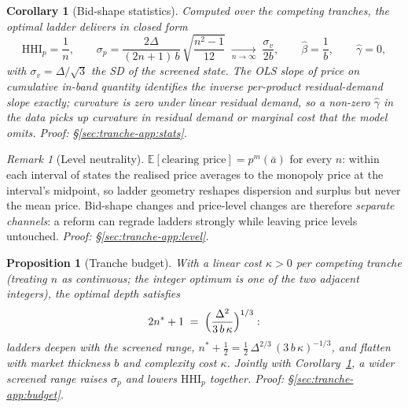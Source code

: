 \documentclass[11pt,a4paper]{article}
\newtheorem{proposition}{Proposition}
\newtheorem{corollary}{Corollary}
\theoremstyle{definition}
\theoremstyle{remark}
\newtheorem{remark}{Remark}
\theoremstyle{plain}
\begin{document}
\begin{corollary}[Bid-shape statistics]\label{cor:stats}
Computed over the competing tranches, the optimal ladder delivers in closed form
\[
\text{HHI}_p = \frac{1}{n}, \qquad
\sigma_p = \frac{2\Delta}{(2n+1)\, b}\,\sqrt{\frac{n^2 - 1}{12}}
\;\xrightarrow[n \to \infty]{}\; \frac{\sigma_v}{2b}, \qquad
\hat\beta = \frac{1}{b}, \qquad \hat\gamma = 0,
\]
with $\sigma_v = \Delta/\sqrt{3}$ the SD of the screened state. The OLS slope of price on cumulative in-band quantity identifies the \emph{inverse} per-product residual-demand slope exactly; curvature is zero under linear residual demand, so a non-zero $\hat\gamma$ in the data picks up curvature in residual demand or marginal cost that the model omits. \emph{Proof: \S\ref{sec:tranche-app:stats}.}
\end{corollary}

\begin{remark}[Level neutrality]\label{rem:level}
$\mathbb{E}[\text{clearing price}] = p^m(\bar a)$ for every $n$: within each interval of states the realised price averages to the monopoly price at the interval's midpoint, so ladder geometry reshapes dispersion and surplus but never the mean price. Bid-shape changes and price-level changes are therefore \emph{separate channels}: a reform can regrade ladders strongly while leaving price levels untouched. \emph{Proof: \S\ref{sec:tranche-app:level}.}
\end{remark}

\begin{proposition}[Tranche budget]\label{prop:budget}
With a linear cost $\kappa > 0$ per competing tranche (treating $n$ as continuous; the integer optimum is one of the two adjacent integers), the optimal depth satisfies
\[
2 n^* + 1 \;=\; \Bigl(\frac{\Delta^2}{3\, b\, \kappa}\Bigr)^{1/3}:
\]
ladders deepen with the screened range, $n^* + \tfrac12 = \tfrac12\,\Delta^{2/3}\,(3\,b\,\kappa)^{-1/3}$, and flatten with market thickness $b$ and complexity cost $\kappa$. Jointly with Corollary~\ref{cor:stats}, a wider screened range raises $\sigma_p$ and lowers $\text{HHI}_p$ \emph{together}. \emph{Proof: \S\ref{sec:tranche-app:budget}.}
\end{proposition}
\end{document}
